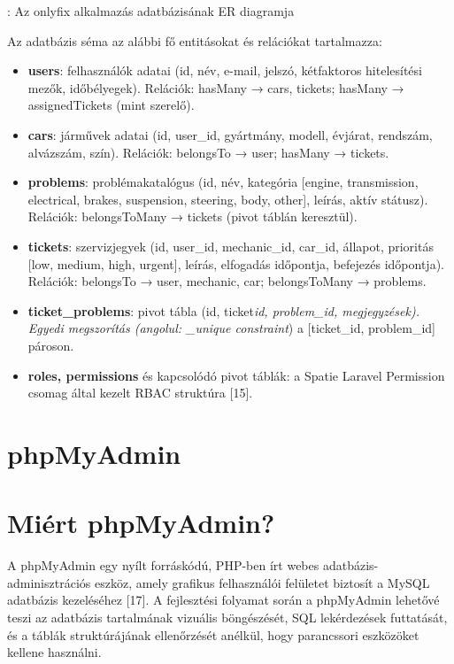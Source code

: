: Az onlyfix alkalmazás adatbázisának ER diagramja

Az adatbázis séma az alábbi fő entitásokat és relációkat tartalmazza:

\begin{itemize}
\item
  \textbf{users}: felhasználók adatai (id, név, e-mail, jelszó, kétfaktoros hitelesítési mezők, időbélyegek). Relációk: hasMany → cars, tickets; hasMany → assignedTickets (mint szerelő).
\item
  \textbf{cars}: járművek adatai (id, user\_id, gyártmány, modell, évjárat, rendszám, alvázszám, szín). Relációk: belongsTo → user; hasMany → tickets.
\item
  \textbf{problems}: problémakatalógus (id, név, kategória {[}engine, transmission, electrical, brakes, suspension, steering, body, other{]}, leírás, aktív státusz). Relációk: belongsToMany → tickets (pivot táblán keresztül).
\item
  \textbf{tickets}: szervizjegyek (id, user\_id, mechanic\_id, car\_id, állapot, prioritás {[}low, medium, high, urgent{]}, leírás, elfogadás időpontja, befejezés időpontja). Relációk: belongsTo → user, mechanic, car; belongsToMany → problems.
\item
  \textbf{ticket\_problems}: pivot tábla (id, ticket\emph{id, problem\_id, megjegyzések). Egyedi megszorítás (angolul: \_unique constraint}) a {[}ticket\_id, problem\_id{]} pároson.
\item
  \textbf{roles, permissions} és kapcsolódó pivot táblák: a Spatie Laravel Permission csomag által kezelt RBAC struktúra {[}15{]}.
\end{itemize}

\section{phpMyAdmin}\label{phpmyadmin}

\section{Miért phpMyAdmin?}\label{miuxe9rt-phpmyadmin}

A phpMyAdmin egy nyílt forráskódú, PHP-ben írt webes adatbázis-adminisztrációs eszköz, amely grafikus felhasználói felületet biztosít a MySQL adatbázis kezeléséhez {[}17{]}. A fejlesztési folyamat során a phpMyAdmin lehetővé teszi az adatbázis tartalmának vizuális böngészését, SQL lekérdezések futtatását, és a táblák struktúrájának ellenőrzését anélkül, hogy parancssori eszközöket kellene használni.

